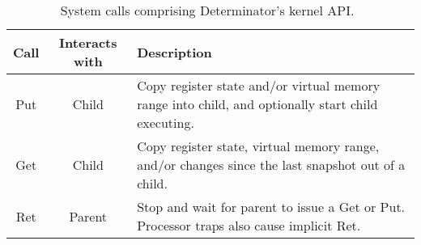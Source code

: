 
\begin{table*}[t]
\centering
\begin{tabular}{c | c | l}
Call & Interacts with & Description \\
\hline
Put & Child & Copy register state and/or virtual memory range
into child, and optionally start child executing. \\
Get & Child & Copy register state, virtual memory range, and/or
changes since the last snapshot out of a child. \\
Ret & Parent & Stop and wait for parent to issue a Get or Put.
Processor traps also cause implicit Ret. \\
\end{tabular}
\caption{System calls comprising Determinator’s kernel API.~\cite{Aviram10}}
\label{tab:syscalls}
\end{table*}

\endinput

